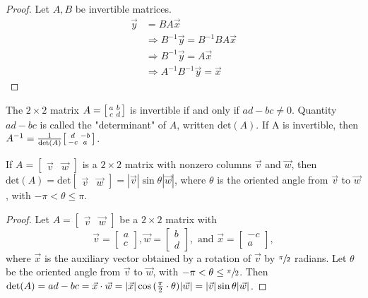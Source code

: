 \documentclass[a4paper,11pt]{article}
\begin{document}
\begin{outline}
    \begin{proof}
      Let \(A,B\) be invertible matrices.
      \begin{align*}
        \vec{y} &= BA\vec{x}                                 \\
                &\Rightarrow B^{-1}\vec{y} = B^{-1}BA\vec{x} \\
                &\Rightarrow B^{-1}\vec{y} = A\vec{x}        \\
                &\Rightarrow A^{-1}B^{-1}\vec{y} = \vec{x}
      \end{align*}
    \end{proof}

    The \(2 \times 2\) matrix \(A = \begin{bsmallmatrix} a & b \\ c & d \end{bsmallmatrix}\) is invertible if and only
    if \(ad-bc \neq 0\). Quantity \(ad - bc\) is called the "determinant" of \(A\), written \(\text{det}(A)\). 
    If A is invertible, then \(A^{-1} = \frac{1}{\text{det}(A)} \begin{bsmallmatrix} d & -b \\ -c & a \end{bsmallmatrix}\).
    
    If \(A = \begin{bmatrix} \vec{v} & \vec{w} \end{bmatrix}\) is a \(2 \times 2\) matrix with nonzero columns
    \(\vec{v}\) and \(\vec{w}\), then \(\text{det}(A) = \text{det}\begin{bmatrix} \vec{v} & \vec{w} \end{bmatrix} =
    |\vec{v}|\sin{\theta}|\vec{w}|\), where \(\theta\) is the oriented angle from \(\vec{v}\) to \(\vec{w}\),
    with \(-\pi < \theta \leq \pi\).
    
    \begin{proof}
      Let \(A = \begin{bmatrix} \vec{v} & \vec{w} \end{bmatrix}\) be a \(2 \times 2\) matrix with 
      \[
        \vec{v} = \begin{bmatrix} a \\ c \end{bmatrix},
        \vec{w} = \begin{bmatrix} b \\ d \end{bmatrix}, \text{ and }
        \vec{x} = \begin{bmatrix} -c \\ a \end{bmatrix},
      \]
      where \(\vec{x}\) is the auxiliary vector obtained by a rotation of \(\vec{v}\) by \(\sfrac{\pi}{2}\) radians. 
      Let \(\theta\) be the oriented angle from \(\vec{v}\) to \(\vec{w}\), with \(-\pi < \theta \leq \sfrac{\pi}{2}\). 
      Then \(\text{det}(A) = ad-bc = \vec{x}\cdot\vec{w} = |\vec{x}|\cos{(\frac{\pi}{2} \cdot \theta)}|\vec{w}| 
      = |\vec{v}|\sin{\theta}|\vec{w}|\).
    \end{proof}


\end{outline}
\end{document}
